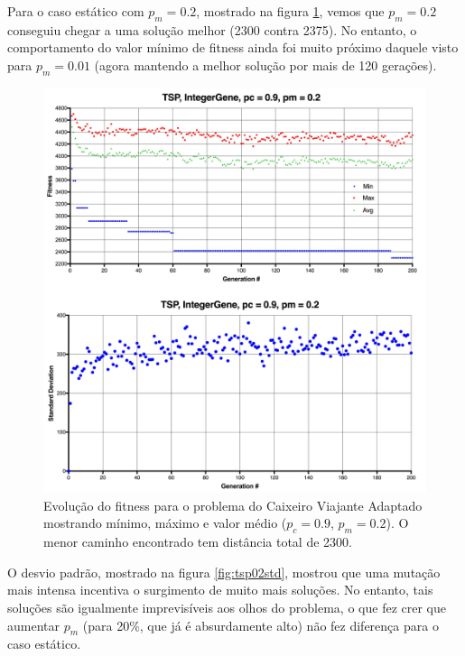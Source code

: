 Para o caso estático com $p_m = 0.2$, mostrado na figura \ref{fig:tsp02}, vemos que $p_m = 0.2$ conseguiu chegar a uma solução melhor (2300 contra 2375). No entanto, o comportamento do valor mínimo de fitness ainda foi muito próximo daquele visto para $p_m = 0.01$ (agora mantendo a melhor solução por mais de 120 gerações).

\begin{figure}[ht!]
    \centering \includegraphics[width=1.0\textwidth]{tsp_02.jpg}
    \caption{Evolução do fitness para o problema do Caixeiro Viajante Adaptado mostrando mínimo, máximo e valor médio ($p_c=0.9$, $p_m=0.2$). O menor caminho encontrado tem distância total de 2300.}
    \label{fig:tsp02}
\end{figure}

O desvio padrão, mostrado na figura \ref{fig:tsp02std}, mostrou que uma mutação mais intensa incentiva o surgimento de muito mais soluções. No entanto, tais soluções são igualmente imprevisíveis aos olhos do problema, o que fez crer que aumentar $p_m$ (para 20\%, que já é absurdamente alto) não fez diferença para o caso estático.

